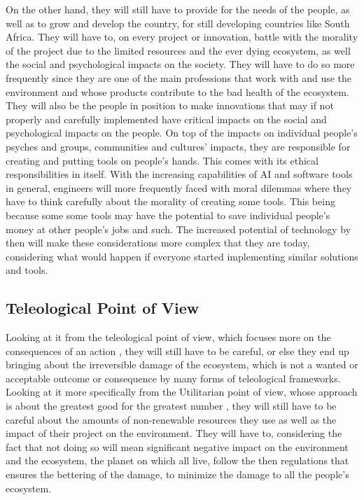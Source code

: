\documentclass[12pt]{witseiepaper}
\begin{document}
    On the other hand, they will still have to provide for the needs of the people, as well as to grow and develop the country, for still developing countries like South Africa. They will have to, on every project or innovation, battle with the morality of the project due to the limited resources and the ever dying ecosystem, as well the social and psychological impacts on the society. They will have to do so more frequently since they are one of the main professions that work with and use the environment and whose products contribute to the bad health of the ecosystem. They will also be the people in position to make innovations that may if not properly and carefully implemented have critical impacts on the social and psychological impacts on the people. On top of the impacts on individual people's psyches and groups, communities and cultures' impacts, they are responsible for creating and putting tools on people's hands. This comes with its ethical responsibilities in itself. With the increasing capabilities of AI and software tools in general, engineers will more frequently faced with moral dilemmas where they have to think carefully about the morality of creating some tools. This being because some some tools may have the potential to save individual people's money at other people's jobs and such. The increased potential of technology by then will make these considerations more complex that they are today, considering what would happen if everyone started implementing similar solutions and tools.   

    \subsection{Teleological Point of View} 

    Looking at it from the teleological point of view, which focuses more on the consequences of an action \citep{ismail2018narrative}, they will still have to be careful, or else they end up bringing about the irreversible damage of the ecosystem, which is not a wanted or acceptable outcome or consequence by many forms of teleological frameworks. 
    Looking at it more specifically from the Utilitarian point of view, whose approach is about the greatest good for the greatest number \citep{ismail2018narrative, ethicsunwrapped}, they will still have to be careful about the amounts of non-renewable resources they use as well as the impact of their project on the environment. They will have to, considering the fact that not doing so will mean significant negative impact on the environment and the ecosystem, the planet on which all live, follow the then regulations that ensures the bettering of the damage, to minimize the damage to all the people’s ecosystem. 
\end{document}
